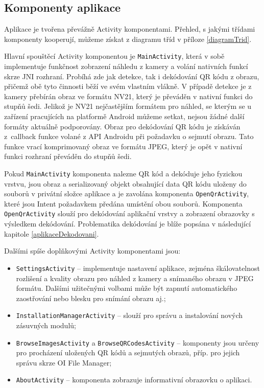 \subsection{Komponenty aplikace}
\label{aplikaceComponents}

Aplikace je tvořena převážně Activity komponentami. Přehled, s jakými
třídami komponenty kooperují, můžeme získat z diagramu tříd v příloze
\ref{diagramTrid}.

Hlavní spouštěcí Activity komponentou je \texttt{MainActivity}, která v sobě
implementuje funkčnost zobrazení náhledu z kamery a volání nativních funkcí skrze JNI
rozhraní. Probíhá zde jak detekce, tak i dekódování
QR kódu z obrazu, přičemž obě tyto činnosti běží ve svém vlastním vlákně. V případě detekce je z kamery
přebírán obraz ve formátu NV21, který je převáděn v nativní funkci do
stupňů šedi. Jelikož je NV21 nejčastějším formátem pro náhled, se kterým se
u zařízení pracujících na platformě Android můžeme setkat, nejsou žádné další
formáty aktuálně podporovány. Obraz pro dekódování QR kódu je získáván
z~callback funkce volané z API Androidu při požadavku o sejmutí obrazu. Tato funkce vrací komprimovaný obraz ve formátu JPEG, který je opět v nativní
funkci rozhraní převáděn do stupňů šedi.

Pokud \texttt{MainActivity} komponenta nalezne QR kód a dekóduje jeho fyzickou
vrstvu, jsou obraz a serializovaný objekt obsahující data QR kódu uloženy do
souborů v privátní složce aplikace a je zavolána komponenta
\texttt{OpenQrActivity}, které jsou Intent požadavkem předána umístění obou
souborů. Komponenta \texttt{OpenQrActivity} slouží pro dekódování aplikační
vrstvy a zobrazení obrazovky s výsledkem dekódování. Problematika dekódování je blíže
popsána v následující kapitole \ref{aplikaceDekodovani}.

\bigskip \noindent Dalšími spíše doplňkovými Activity komponentami jsou:

\begin{itemize}
  \item \texttt{SettingsActivity} -- implementuje nastavení aplikace, zejména
  škálovatelnost rozlišení a kvality obrazu pro náhled z kamery a snímaného obrazu v JPEG formátu. Dalšími užitečnými volbami může být zapnutí automatického zaostřování nebo blesku pro snímání obrazu aj.;
  \item \texttt{InstallationManagerActivity} -- slouží pro správu a instalování
  nových zásuvných modulů;
  \item \texttt{BrowseImagesActivity} a \texttt{BrowseQRCodesActivity} --
  komponenty jsou určeny pro procházení uložených QR kódů a sejmutých obrazů, příp. pro jejich správu skrze OI File Manager;
  \item \texttt{AboutActivity} -- komponenta zobrazuje informativní obrazovku o
  aplikaci.
\end{itemize}

